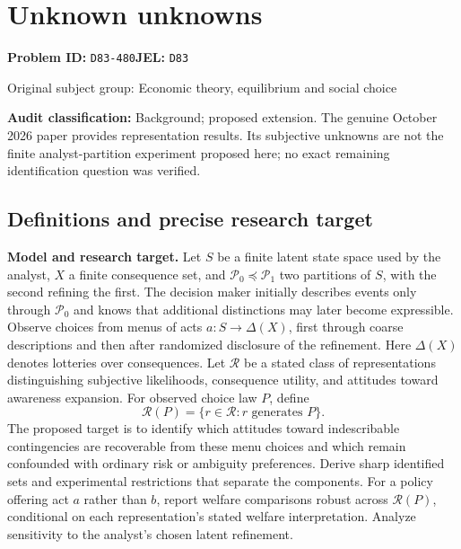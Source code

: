 \documentclass[11pt,a4paper]{article}
\begin{document}
\section*{Unknown unknowns}
\textbf{Problem ID:} \texttt{D83-480}\quad \textbf{JEL:} \texttt{D83}\par
\label{problem:OP-0276}
{\sffamily\small\color{muted}Original subject group: Economic theory, equilibrium and social choice\par}
\label{definitions:problem:30007557}
\textbf{Audit classification:} Background; proposed extension. The genuine October 2026 paper provides representation results. Its subjective unknowns are not the finite analyst-partition experiment proposed here; no exact remaining identification question was verified.
\subsection*{Definitions and precise research target}
\textbf{Model and research target.} Let \(S\) be a finite latent state space used by the analyst, \(X\) a finite consequence set, and \(\mathcal P_0\preceq\mathcal P_1\) two partitions of \(S\), with the second refining the first. The decision maker initially describes events only through \(\mathcal P_0\) and knows that additional distinctions may later become expressible. Observe choices from menus of acts \(a:S\to\Delta(X)\), first through coarse descriptions and then after randomized disclosure of the refinement. Here \(\Delta(X)\) denotes lotteries over consequences. Let \(\mathcal R\) be a stated class of representations distinguishing subjective likelihoods, consequence utility, and attitudes toward awareness expansion. For observed choice law \(P\), define
\[
 \mathcal R(P)=\{r\in\mathcal R:r\text{ generates }P\}.
\]
The proposed target is to identify which attitudes toward indescribable contingencies are recoverable from these menu choices and which remain confounded with ordinary risk or ambiguity preferences. Derive sharp identified sets and experimental restrictions that separate the components. For a policy offering act \(a\) rather than \(b\), report welfare comparisons robust across \(\mathcal R(P)\), conditional on each representation's stated welfare interpretation. Analyze sensitivity to the analyst's chosen latent refinement.
\end{document}
